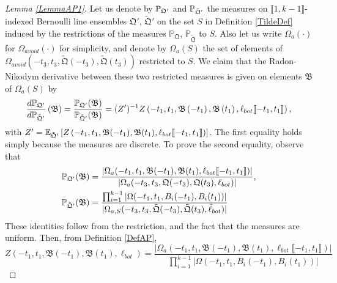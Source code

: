 \begin{proof}[Lemma \ref{LemmaAP1}]
	
	Let us denote by $\mathbb{P}_{\mathfrak{Q}'}$ and $\mathbb{P}_{\tilde{\mathfrak{Q}}'}$ the measures on $\llbracket 1, k-1\rrbracket$-indexed Bernoulli line ensembles $\mathfrak{Q}'$, $\tilde{\mathfrak{Q}}'$ on the set $S$ in Definition \ref{TildeDef} induced by the restrictions of the measures $\mathbb{P}_{\mathfrak{Q}}$, $\mathbb{P}_{\tilde{\mathfrak{Q}}}$ to $S$. Also let us write $\Omega_a(\cdot)$ for $\Omega_{avoid}(\cdot)$ for simplicity, and denote by $\Omega_a(S)$ the set of elements of $\Omega_{avoid}(-t_3,t_3,\tilde{\mathfrak{Q}}(-t_3),\tilde{\mathfrak{Q}}(t_3))$ restricted to $S$. We claim that the Radon-Nikodym derivative between these two restricted measures is given on elements $\mathfrak B$ of $\Omega_a(S)$ by \begin{equation}\label{propRadon}
		\frac{d\mathbb{P}_{\mathfrak{Q}'}}{d\mathbb{P}_{\tilde{\mathfrak{Q}}'}}\left(\mathfrak B\right) = \frac{\mathbb{P}_{\mathfrak{Q}'}(\mathfrak{B})}{\mathbb{P}_{\tilde{\mathfrak{Q}}'}(\mathfrak{B})} = (Z')^{-1} Z\left(-t_1,t_1,\mathfrak{B}\left(-t_1\right),\mathfrak{B}\left(t_1\right),\ell_{bot}\llbracket -t_1,t_1\rrbracket\right),
	\end{equation}
	with $Z' = \mathbb{E}_{\tilde{\mathfrak{Q}}'}\left[Z\left(-t_1, t_1, \mathfrak B(-t_1), \mathfrak B(t_1), \ell_{bot}\llbracket -t_1, t_1\rrbracket\right)\right]$. The first equality holds simply because the measures are discrete. To prove the second equality, observe that
	\begin{equation}
		\begin{split}
			\mathbb{P}_{\mathfrak{Q}'}(\mathfrak{B}) &= \frac{|\Omega_a(-t_1,t_1,\mathfrak{B}(-t_1),\mathfrak{B}(t_1),\ell_{bot}\llbracket -t_1,t_1\rrbracket)|}{|\Omega_a(-t_3,t_3,{\mathfrak{Q}}(-t_3),{\mathfrak{Q}}(t_3),\ell_{bot})|}, 
			\\
			\mathbb{P}_{\tilde{\mathfrak{Q}}'}(\mathfrak{B}) &= \frac{\prod_{i = 1}^{k-1}|\Omega(-t_1,t_1,B_i(-t_1),B_i(t_1))|}{|\Omega_{a,S}(-t_3,t_3,\tilde{\mathfrak{Q}}(-t_3),\tilde{\mathfrak{Q}}(t_3),\tilde\ell_{bot})|}
		\end{split}
	\end{equation}
	These identities follow from the restriction, and the fact that the measures are uniform. Then, from Definition \ref{DefAP}, 
	\[
	Z(-t_1,t_1,\mathfrak{B}(-t_1),\mathfrak{B}(t_1),\ell_{bot}) = \frac{|\Omega_a(-t_1,t_1,\mathfrak{B}(-t_1),\mathfrak{B}(t_1),\ell_{bot}\llbracket-t_1,t_1\rrbracket)|}{\prod_{i = 1}^{k-1}|\Omega(-t_1,t_1, B_i(-t_1),B_i(t_1))|}
\]
\end{proof}
